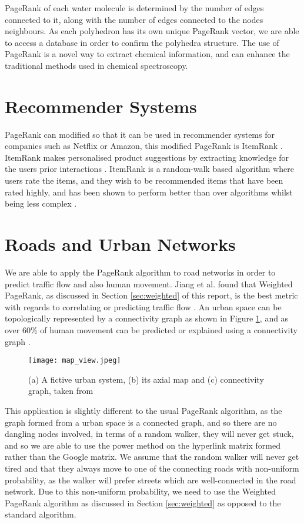 \documentclass[11pt]{report}
\begin{document}
PageRank of each water molecule is determined by the number of edges connected to it, along with the number of edges connected to the nodes neighbours. As each polyhedron has its own unique PageRank vector, we are able to access a database in order to confirm the polyhedra structure. The use of PageRank is a novel way to extract chemical information, and can enhance the traditional methods used in chemical spectroscopy.

\section{Recommender Systems} \label{sec:recommender}
PageRank can modified so that it can be used in recommender systems for companies such as Netflix or Amazon, this modified PageRank is ItemRank \cite{gleich2015pagerank}. ItemRank makes personalised product suggestions by extracting knowledge for the users prior interactions \cite{gori2007itemrank}. ItemRank is a random-walk based algorithm where users rate the items, and they wish to be recommended items that have been rated highly, and has been shown to perform better than over algorithms whilst being less complex \cite{gori2007itemrank}.

\section{Roads and Urban Networks} \label{sec:Roads}
We are able to apply the PageRank algorithm to road networks in order to predict traffic flow and also human movement. Jiang et al. found that Weighted PageRank, as discussed in Section \ref{sec:weighted} of this report, is the best metric with regards to correlating or predicting traffic flow \cite{1742-5468-2008-07-P07008}. An urban space can be topologically represented by a connectivity graph as shown in Figure \ref{fig:city rep}, and as over 60\% of human movement can be predicted or explained using a connectivity graph \cite{doi:10.1080/13658810802022822}.

\begin{figure}[h]
\centering
\texttt{[image: map\_view.jpeg]}
\caption{(a) A fictive urban system, (b) its axial map and (c) connectivity graph, taken from \cite{doi:10.1080/13658810802022822}}
\label{fig:city rep}
\end{figure}

This application is slightly different to the usual PageRank algorithm, as the graph formed from a urban space is a connected graph, and so there are no dangling nodes involved, in terms of a random walker, they will never get stuck, and so we are able to use the power method on the hyperlink matrix formed rather than the Google matrix. We assume that the random walker will never get tired and that they always move to one of the connecting roads with non-uniform probability, as the walker will prefer streets which are well-connected in the road network. Due to this non-uniform probability, we need to use the Weighted PageRank algorithm as discussed in Section \ref{sec:weighted} as opposed to the standard algorithm.
\FloatBarrier
\end{document}
